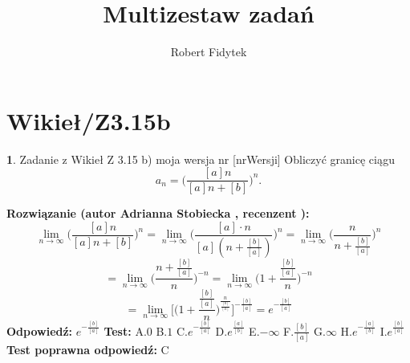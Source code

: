 \documentclass[12pt, a4paper]{article}
\title{Multizestaw zadań}
\author{Robert Fidytek}
\date{}
\theoremstyle{definition} %
\newtheorem{zad}{}
\newcommand{\kategoria}[1]{\section{#1}} %
\newcommand{\zadStart}[1]{\begin{zad}#1\newline} %
\newcommand{\zadStop}{\end{zad}}   %
\newcommand{\rozwStart}[2]{\noindent \textbf{Rozwiązanie (autor #1 , recenzent #2): }\newline} %
\newcommand{\rozwStop}{\newline}                                            %
\newcommand{\odpStart}{\noindent \textbf{Odpowiedź:}\newline}    %
\newcommand{\odpStop}{\newline}                                             %
\newcommand{\testStart}{\noindent \textbf{Test:}\newline} %
\newcommand{\testStop}{\newline} %
\newcommand{\kluczStart}{\noindent \textbf{Test poprawna odpowiedź:}\newline} %
\newcommand{\kluczStop}{\newline} %
\begin{document}
\maketitle


\kategoria{Wikieł/Z3.15b}
\zadStart{Zadanie z Wikieł Z 3.15 b) moja wersja nr [nrWersji]}
Obliczyć granicę ciągu 
$$a_n=\bigg(\frac{[a]n}{[a]n+[b]}\bigg)^{n}.$$
\zadStop
\rozwStart{Adrianna Stobiecka}{}
$$\lim_{n\to\infty}\bigg(\frac{[a]n}{[a]n+[b]}\bigg)^{n}=\lim_{n\to\infty}\bigg(\frac{[a]\cdot n}{[a](n+\frac{[b]}{[a]})}\bigg)^{n}=\lim_{n\to\infty}\bigg(\frac{n}{n+\frac{[b]}{[a]}}\bigg)^{n}$$
$$=\lim_{n\to\infty}\bigg(\frac{n+\frac{[b]}{[a]}}{n}\bigg)^{-n}=\lim_{n\to\infty}\bigg(1+\frac{\frac{[b]}{[a]}}{n}\bigg)^{-n}$$
$$=\lim_{n\to\infty}\bigg[\bigg(1+\frac{\frac{[b]}{[a]}}{n}\bigg)^{\frac{n}{\frac{[b]}{[a]}}}\bigg]^{-\frac{[b]}{[a]}}=e^{-\frac{[b]}{[a]}}$$
\rozwStop
\odpStart
$e^{-\frac{[b]}{[a]}}$
\odpStop
\testStart
A.$0$
B.$1$
C.$e^{-\frac{[b]}{[a]}}$
D.$e^{\frac{[a]}{[b]}}$
E.$-\infty$
F.$\frac{[b]}{[a]}$
G.$\infty$
H.$e^{-\frac{[a]}{[b]}}$
I.$e^{\frac{[b]}{[a]}}$
\testStop
\kluczStart
C
\kluczStop
\end{document}

